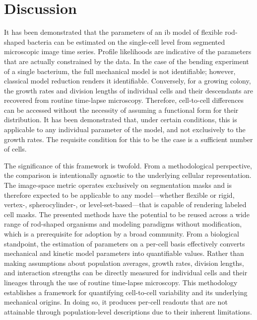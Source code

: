 
\section{Discussion}
It has been demonstrated that the parameters of an \ac{ib} model of flexible rod-shaped bacteria can
be estimated on the single-cell level from segmented microscopic image time series.
Profile likelihoods are indicative of the parameters that are actually constrained by the data.
In the case of the bending experiment of a single bacterium, the full mechanical model is not
identifiable; however, classical model reduction renders it identifiable.
Conversely, for a growing colony, the growth rates and division lengths of individual cells and
their descendants are recovered from routine time-lapse microscopy.
Therefore, cell-to-cell differences can be accessed without the necessity of assuming a functional
form for their distribution.
It has been demonstrated that, under certain conditions, this is applicable to any individual
parameter of the model, and not exclusively to the growth rates.
The requisite condition for this to be the case is a sufficient number of cells.

The significance of this framework is twofold.
From a methodological perspective, the comparison is intentionally agnostic to the underlying
cellular representation.
The image-space metric operates exclusively on segmentation masks and is therefore expected to be
applicable to any model—whether flexible or rigid, vertex-, spherocylinder-, or level-set-based—that
is capable of rendering labeled cell masks.
The presented methods have the potential to be reused across a wide range of rod-shaped organisms
and modeling paradigms without modification, which is a prerequisite for adoption by a broad
community.
From a biological standpoint, the estimation of parameters on a per-cell basis effectively converts
mechanical and kinetic model parameters into quantifiable values.
Rather than making assumptions about population averages, growth rates, division lengths, and
interaction strengths can be directly measured for individual cells and their lineages through the
use of routine time-lapse microscopy.
This methodology establishes a framework for quantifying cell-to-cell variability and its underlying
mechanical origins.
In doing so, it produces per-cell readouts that are not attainable through population-level
descriptions due to their inherent limitations.

